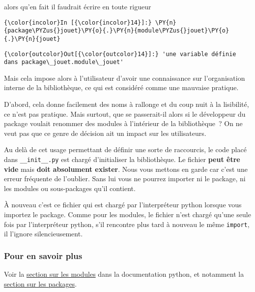     alors qu'en fait il faudrait écrire en toute rigueur

    \begin{Verbatim}[commandchars=\\\{\},frame=single,framerule=0.3mm,rulecolor=\color{cellframecolor}]
{\color{incolor}In [{\color{incolor}14}]:} \PY{n}{package\PYZus{}jouet}\PY{o}{.}\PY{n}{module\PYZus{}jouet}\PY{o}{.}\PY{n}{jouet}
\end{Verbatim}


\begin{Verbatim}[commandchars=\\\{\},frame=single,framerule=0.3mm,rulecolor=\color{cellframecolor}]
{\color{outcolor}Out[{\color{outcolor}14}]:} 'une variable définie dans package\_jouet.module\_jouet'
\end{Verbatim}
            
    Mais cela impose alors à l'utilisateur d'avoir une connaissance sur
l'organisation interne de la bibliothèque, ce qui est considéré comme
une mauvaise pratique.

D'abord, cela donne facilement des noms à rallonge et du coup nuit à la
lisibilité, ce n'est pas pratique. Mais surtout, que se passerait-il
alors si le développeur du package voulait renommer des modules à
l'intérieur de la bibliothèque~? On ne veut pas que ce genre de décision
ait un impact sur les utilisateurs.

    Au delà de cet usage permettant de définir une sorte de raccourcis, le
code placé dans \texttt{\_\_init\_\_.py} est chargé d'initialiser la
bibliothèque. Le fichier \textbf{peut être vide} mais \textbf{doit
absolument exister}. Nous vous mettons en garde car c'est une erreur
fréquente de l'oublier. Sans lui vous ne pourrez importer ni le package,
ni les modules ou sous-packages qu'il contient.

    À nouveau c'est ce fichier qui est chargé par l'interpréteur python
lorsque vous importez le package. Comme pour les modules, le fichier
n'est chargé qu'une seule fois par l'interpréteur python, s'il rencontre
plus tard à nouveau le même \texttt{import}, il l'ignore
silencieusement.

    \hypertarget{pour-en-savoir-plus}{%
\subsubsection{Pour en savoir plus}\label{pour-en-savoir-plus}}

    Voir la \href{https://docs.python.org/3/tutorial/modules.html}{section
sur les modules} dans la documentation python, et notamment la
\href{https://docs.python.org/3/tutorial/modules.html\#packages}{section
sur les packages}.


    
    
    

